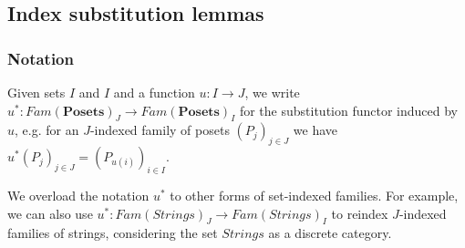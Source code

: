 \documentclass{article}
\newcommand{\mbf}{\mathbf}
\newcommand{\sdisp}[1]{
\left( #1 \right)
}
\begin{document}
\subsection*{Index substitution lemmas}

\subsubsection*{Notation}

Given sets $I$ and $I$ and a function $u : I \to J$, we write $u^* : \mathit{Fam}(\mbf{Posets})_J \to \mathit{Fam}(\mbf{Posets})_I$ for the substitution functor induced by $u$, e.g. for an $J$-indexed family of posets $\sdisp{P_j}_{j \in J}$ we have $u^* \sdisp{P_j}_{j \in J} = \sdisp{ P_{u(i)} }_{i \in I}$.

We overload the notation $u^*$ to other forms of set-indexed families. For example, we can also use $u^* : \mathit{Fam}(\mathit{Strings})_J \to \mathit{Fam}(\mathit{Strings})_I$ to reindex $J$-indexed families of strings, considering the set $\mathit{Strings}$ as a discrete category. 
\end{document}
